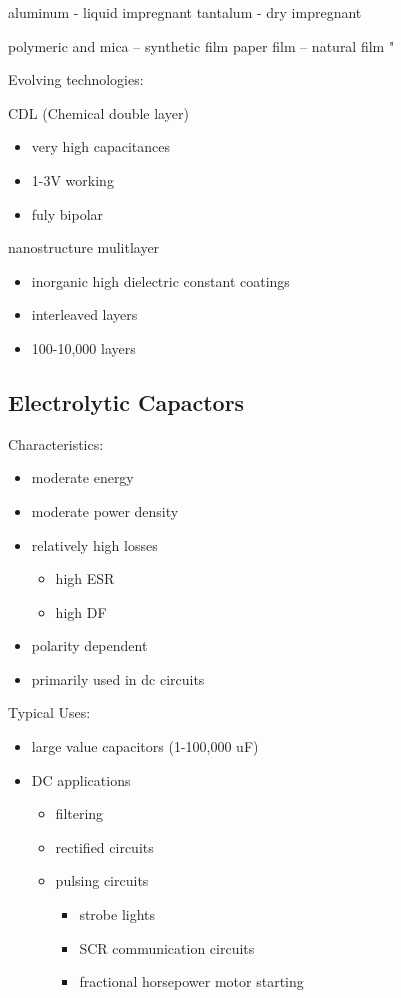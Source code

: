aluminum - liquid impregnant
tantalum - dry impregnant

polymeric and mica -- synthetic film
paper film         -- natural film
"
\cite{capRev}

Evolving technologies:

CDL (Chemical double layer)
\begin{itemize}
    \item very high capacitances
    \item 1-3V working
    \item fuly bipolar
\end{itemize}

nanostructure mulitlayer
\begin{itemize}
    \item inorganic high dielectric constant coatings
    \item interleaved layers
    \item 100-10,000 layers
\end{itemize}
\cite{capRev}

\subsection{Electrolytic Capactors}

Characteristics:
\begin{itemize}
    \item moderate energy
    \item moderate power density
    \item relatively high losses
    \begin{itemize}
        \item high ESR
        \item high DF
    \end{itemize}
    \item polarity dependent
    \item primarily used in dc circuits
\end{itemize}

Typical Uses:
\begin{itemize}
    \item large value capacitors (1-100,000 uF)
    \item DC applications
    \begin{itemize}
        \item filtering
        \item rectified circuits
        \item pulsing circuits
        \begin{itemize}
            \item strobe lights
            \item SCR communication circuits
            \item fractional horsepower motor starting
        \end{itemize}
    \end{itemize}
\end{itemize}
\cite{capRev}

